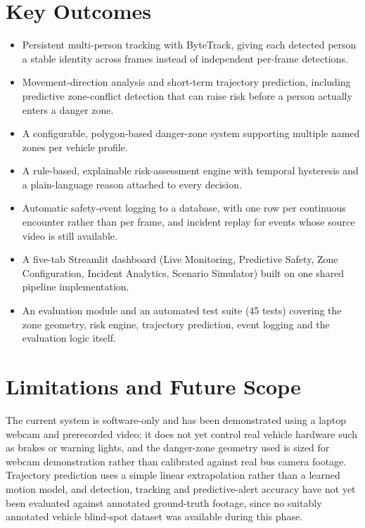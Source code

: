 \documentclass[12pt,a4paper]{report}
\begin{document}
\section{Key Outcomes}
\begin{itemize}[leftmargin=*,itemsep=2pt]
\item Persistent multi-person tracking with ByteTrack, giving each detected person a stable identity across frames instead of independent per-frame detections.
\item Movement-direction analysis and short-term trajectory prediction, including predictive zone-conflict detection that can raise risk before a person actually enters a danger zone.
\item A configurable, polygon-based danger-zone system supporting multiple named zones per vehicle profile.
\item A rule-based, explainable risk-assessment engine with temporal hysteresis and a plain-language reason attached to every decision.
\item Automatic safety-event logging to a database, with one row per continuous encounter rather than per frame, and incident replay for events whose source video is still available.
\item A five-tab Streamlit dashboard (Live Monitoring, Predictive Safety, Zone Configuration, Incident Analytics, Scenario Simulator) built on one shared pipeline implementation.
\item An evaluation module and an automated test suite (45 tests) covering the zone geometry, risk engine, trajectory prediction, event logging and the evaluation logic itself.
\end{itemize}

\section{Limitations and Future Scope}
The current system is software-only and has been demonstrated using a laptop webcam and prerecorded video; it does not yet control real vehicle hardware such as brakes or warning lights, and the danger-zone geometry used is sized for webcam demonstration rather than calibrated against real bus camera footage. Trajectory prediction uses a simple linear extrapolation rather than a learned motion model, and detection, tracking and predictive-alert accuracy have not yet been evaluated against annotated ground-truth footage, since no suitably annotated vehicle blind-spot dataset was available during this phase.
\end{document}
